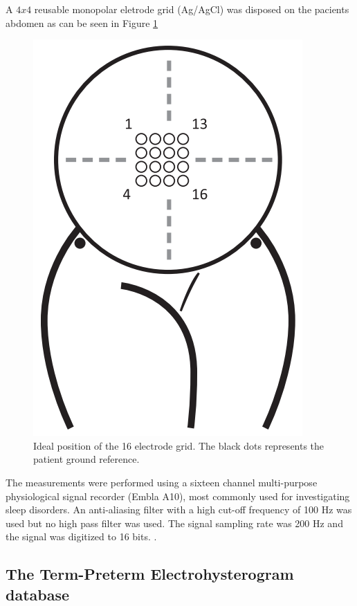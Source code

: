 \documentclass[bioengineering,article,submit,moreauthors,pdftex,10pt,a4paper]{mdpi}
\begin{document}
A $4x4$ reusable monopolar eletrode grid (Ag/AgCl) was disposed on the pacients abdomen as can be seen in Figure \ref{abd_elec} 


 \begin{figure}[H]
 	\caption{\label{abd_elec} Ideal position of the 16 electrode grid. The black dots represents the patient ground reference.}
 	\begin{center}
 		\includegraphics[scale=0.35]{imagens/abd_elec.png} 		
 	\end{center}
 \end{figure}

The measurements were performed using a sixteen channel multi-purpose physiological signal
recorder (Embla A10), most commonly used for investigating sleep disorders. An anti-aliasing filter with
a high cut-off frequency of 100 Hz was used but no high pass filter was used. The signal sampling rate was 200 Hz and the signal was digitized to 16 bits.  \cite{ref-islddatabase}.

\subsection{The Term-Preterm Electrohysterogram database}
\end{document}

